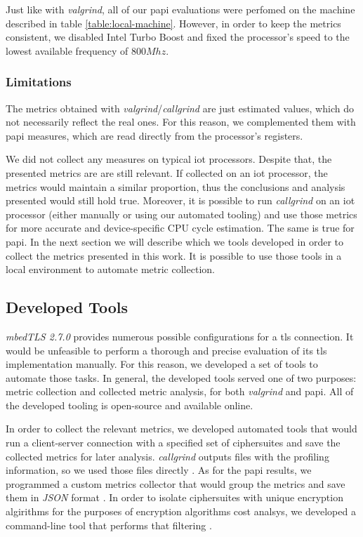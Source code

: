 Just like with \textit{valgrind}, all of our \gls{papi} evaluations were perfomed on the machine
described in table \ref{table:local-machine}. However, in order to keep the metrics consistent,
we disabled Intel Turbo Boost \cite{charles2009evaluation} and fixed the processor's speed to the lowest available frequency
of $800Mhz$.

\subsubsection{Limitations}

The metrics obtained with \textit{valgrind}/\textit{callgrind} are just estimated values, which do not
necessarily reflect the real ones. For this reason, we complemented them with \gls{papi} measures, which
are read directly from the processor's registers.

We did not collect any measures on typical \gls{iot} processors. Despite that, the presented metrics are are still
relevant. If collected on an \gls{iot} processor, the metrics would maintain a similar proportion, thus
the conclusions and analysis presented would still hold true. Moreover, it is possible to run \textit{callgrind}
on an \gls{iot} processor (either manually or using our automated tooling) and use those metrics for more accurate 
and device-specific CPU cycle estimation. The same is true for \gls{papi}. In the next section we will describe which we tools developed in order 
to collect the metrics presented in this work. It is possible to use those tools in a local environment to 
automate metric collection.

\subsection{Developed Tools}

\textit{mbedTLS 2.7.0} provides numerous possible configurations for a \gls{tls} connection. It would be unfeasible to
perform a thorough and precise evaluation of its \gls{tls} implementation manually. For this reason, we developed a set
of tools to automate those tasks. In general, the developed tools served one of two purposes: metric collection and
collected metric analysis, for both \textit{valgrind} and \gls{papi}. All of the developed tooling is open-source
and available online.

In order to collect the relevant metrics, we developed automated tools that would run a client-server connection with a specified set
of ciphersuites and save the collected metrics for later analysis. \textit{callgrind} outputs files with the profiling information,
so we used those files directly \cite{iluxonch23:online}. As for the \gls{papi} results, we programmed a custom metrics collector that 
would group the metrics and save them in \textit{JSON} format \cite{iluxonch67:online}. In order to isolate ciphersuites with unique encryption
algirithms for the purposes of encryption algorithms cost analsys, we developed a command-line tool
that performs that filtering \cite{iluxonch73:online}.

